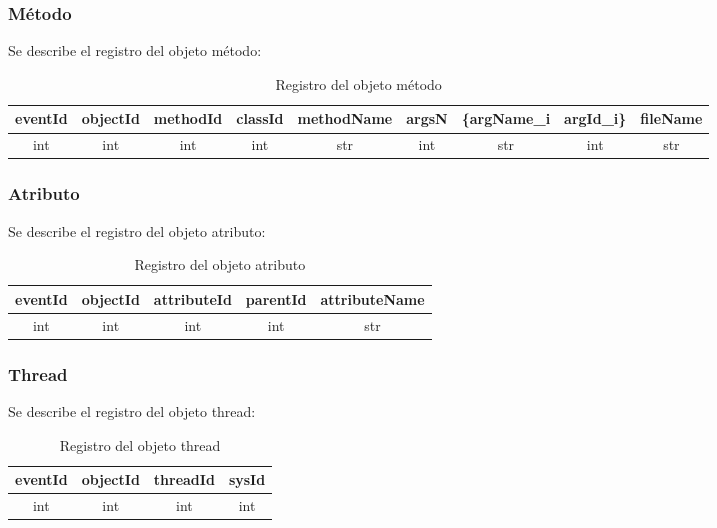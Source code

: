 \documentclass[10pt,a4paper]{article}
\begin{document}

\subsubsection{Método}
Se describe el registro del objeto método:\\

\begin{table}[!h]
\begin{center}
\begin{tabular}{| c | c | c | c | c | c | c | c | c |}
\hline
eventId & objectId & methodId & classId & methodName & argsN & \{argName_{i} & argId_{i}\} & fileName\\
\hline
int & int & int & int & str & int & str & int & str\\
\hline
\end{tabular}
\caption{Registro del objeto método} 
\end{center}
\end{table}

\subsubsection{Atributo}
Se describe el registro del objeto atributo:\\

\begin{table}[!h]
\begin{center}
\begin{tabular}{| c | c | c | c | c |}
\hline
eventId & objectId & attributeId & parentId & attributeName\\
\hline
int & int & int & int & str\\
\hline
\end{tabular}
\caption{Registro del objeto atributo} 
\end{center}
\end{table}

\subsubsection{Thread}
Se describe el registro del objeto thread: \\

\begin{table}[!h]
\begin{center}
\begin{tabular}{| c | c | c | c |}
\hline
eventId & objectId & threadId & sysId\\
\hline
int & int & int & int\\
\hline
\end{tabular}
\caption{Registro del objeto thread} 
\end{center}
\end{table}
\newpage
\end{document}
